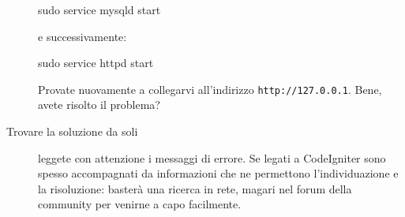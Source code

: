 \begin{description}
\begin{code}
sudo service mysqld start
\end{code}

e successivamente:

\begin{code}
sudo service httpd start
\end{code}

Provate nuovamente a collegarvi all'indirizzo \verb|http://127.0.0.1|. Bene, avete risolto il problema?
\item[Trovare la soluzione da soli] leggete con attenzione i messaggi di errore. Se legati a CodeIgniter sono spesso accompagnati da informazioni che ne permettono l'individuazione e la risoluzione: basterà una ricerca in rete, magari nel forum della community per venirne a capo facilmente.
\end{description}